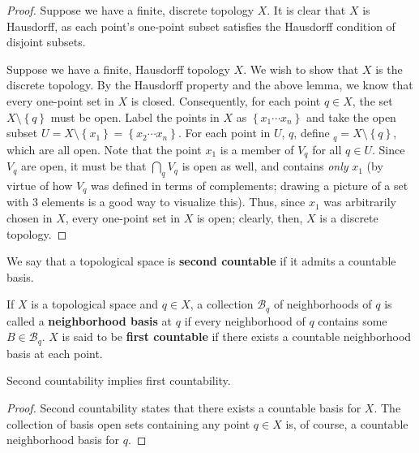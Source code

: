 \documentclass{mathnotes}
\begin{document}
\begin{proof}
    Suppose we have a finite, discrete topology $X$. It is clear that $X$ is Hausdorff, as each point's one-point subset satisfies
    the Hausdorff condition of disjoint subsets.

    Suppose we have a finite, Hausdorff topology $X$. We wish to show that $X$ is the discrete topology. By the Hausdorff property
    and the above lemma, we know that every one-point set in $X$ is closed. Consequently, for each point $q\in X$, the set
    $X\setminus \left\{ q \right\}$ must be open. Label the points in $X$ as $\left\{ x_1\cdots x_n \right\}$ and take the open subset
    $U=X\setminus \left\{ x_1 \right\}=\left\{ x_2\cdots x_n \right\}$. For each point in $U$, $q$, define $ _q=X\setminus \left\{ q \right\}$,
    which are all open. Note that the point $x_1$ is a member of $V_q$ for all $q\in U$. Since $V_q$ are open, it must be that $\bigcap_q V_q$
    is open as well, and contains \textit{only} $x_1$ (by virtue of how $V_q$ was defined in terms of complements; drawing a picture of a
    set with 3 elements is a good way to visualize this). Thus, since $x_1$ was arbitrarily chosen in $X$, every one-point set in $X$ is open;
    clearly, then, $X$ is a discrete topology.
\end{proof}

\begin{defn}
    We say that a topological space is \textbf{second countable} if it admits a countable basis.
\end{defn}

\begin{defn}
    If $X$ is a topological space and $q\in X$, a collection $\mathcal{B}_q$ of neighborhoods of $q$ is called a \textbf{neighborhood basis}
    at $q$ if every neighborhood of $q$ contains some $B\in \mathcal{B}_q$. $X$ is said to be \textbf{first countable} if there exists a 
    countable neighborhood basis at each point.
\end{defn}

\begin{cor}
    Second countability implies first countability.
\end{cor}

\begin{proof}
    Second countability states that there exists a countable basis for $X$. The collection of basis open sets containing any point $q\in X$
    is, of course, a countable neighborhood basis for $q$.
\end{proof}
\end{document}

